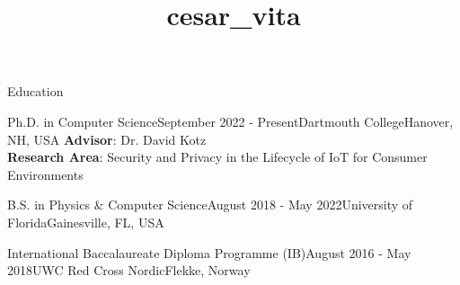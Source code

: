\documentclass{resume} %
\begin{document}
\title{cesar_vita}

\begin{rSection}{Education}

\begin{rSubsection}{Ph.D. in Computer Science}{September 2022 - Present}{Dartmouth College}{Hanover, NH, USA}
  \vspace{-.1cm}
  \textbf{Advisor}: Dr. David Kotz\\ \textbf{Research Area}: Security and Privacy in the Lifecycle of IoT for Consumer
Environments
  \vspace{-.65cm}
  \item[]
\end{rSubsection}

\begin{rSubsection}{B.S. in Physics \& Computer Science}{August 2018 - May 2022}{University of Florida}{Gainesville, FL, USA}
  \vspace{-.65cm}
  \item[]
\end{rSubsection}

\begin{rSubsection}{International Baccalaureate Diploma Programme (IB)}{August 2016 - May 2018}{UWC Red Cross Nordic}{Flekke, Norway}
  \vspace{-.65cm}
  \item[]
\end{rSubsection}
\end{rSection}
\end{document}
